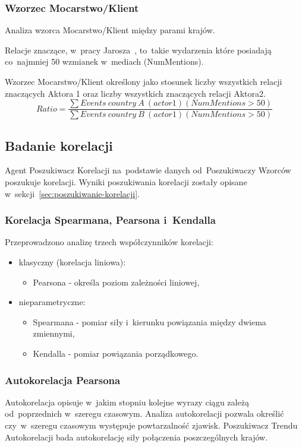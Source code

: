 \documentclass[11pt]{report}
\begin{document}
    \subsubsection{Wzorzec Mocarstwo/Klient}
    Analiza wzorca Mocarstwo/Klient między parami krajów.

    Relacje znaczące, w~pracy Jarosza~\cite{Jarosz2020}, to~takie wydarzenia które posiadają co~najmniej 50 wzmianek w~mediach (NumMentions).\@ %

    Wzorzec Mocarstwo/Klient określony jako stosunek liczby wszystkich relacji znaczących Aktora 1 oraz liczby wszystkich znaczących relacji Aktora2. %
    \[ Ratio = \frac
    {\sum{Events\ country\ A\ (actor 1) (NumMentions > 50)}}
    {\sum{Events\ country\ B\ (actor 1) (NumMentions > 50)}}
    \]

    \subsection{Badanie korelacji}
    Agent Poszukiwacz Korelacji na~podstawie danych od~Poszukiwaczy Wzorców poszukuje korelacji.
    Wyniki poszukiwania korelacji zostały opisane w~sekcji~\ref{sec:poszukiwanie-korelacji}.

    \subsubsection{Korelacja Spearmana, Pearsona i~Kendalla}

    Przeprowadzono analizę trzech współczynników korelacji:
    \begin{itemize}
        \item klasyczny (korelacja liniowa):
        \begin{itemize}
            \item Pearsona - określa poziom zależności liniowej,
        \end{itemize}
        \item nieparametryczne:
        \begin{itemize}
            \item Spearmana - pomiar siły i~kierunku powiązania między dwiema zmiennymi,
            \item Kendalla - pomiar powiązania porządkowego.
        \end{itemize}
    \end{itemize}

    \subsubsection{Autokorelacja Pearsona}
    Autokorelacja opisuje w~jakim stopniu kolejne wyrazy ciągu zależą od~poprzednich w~szeregu czasowym.
    Analiza autokorelacji pozwala określić czy~w~szeregu czasowym występuje powtarzalność zjawisk.
    Poszukiwacz Trendu Autokorelacji bada autokorelację siły połączenia poszczególnych krajów.
\end{document}
